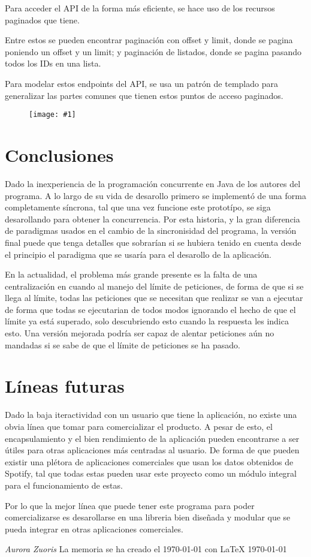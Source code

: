 \documentclass{article}
\newcommand{\cimg}[2]{
\begin{figure}[H]
	\center
		\texttt{[image: \#1]}
\end{figure}
}
\begin{document}
Para acceder el API de la forma más eficiente, se hace uso de los recursos paginados que tiene.

Entre estos se pueden encontrar paginación con offset y limit, donde se pagina poniendo un offset y un limit;
y paginación de listados, donde se pagina pasando todos los IDs en una lista.

Para modelar estos endpoints del API, se usa un patrón de templado para generalizar las partes comunes que tienen
estos puntos de acceso paginados.

\cimg{template.png}{0.9}

\newpage

\section{Conclusiones}

Dado la inexperiencia de la programación concurrente en Java de los autores del programa.
A lo largo de su vida de desarollo primero se implementó de una forma completamente síncrona,
tal que una vez funcione este prototípo, se siga desarollando para obtener la concurrencia.
Por esta historia, y la gran diferencia de paradigmas usados en el cambio de la sincronisidad
del programa, la versión final puede que tenga detalles que sobrarían si
se hubiera tenido en cuenta desde el principio el paradigma que se usaría para el desarollo de la aplicación.

En la actualidad, el problema más grande presente es la falta de una centralización en cuando al
manejo del límite de peticiones, de forma de que si se llega al límite, todas las peticiones
que se necesitan que realizar se van a ejecutar de forma que todas se ejecutarian de todos modos
ignorando el hecho de que el límite ya está superado, solo descubriendo esto cuando la respuesta les indica
esto. Una versión mejorada podría ser capaz de alentar peticiones aún no mandadas si se sabe de que el límite de
peticiones se ha pasado.

\section{Líneas futuras}

Dado la baja iteractividad con un usuario que tiene la aplicación, no existe
una obvia línea que tomar para comercializar el producto.
A pesar de esto, el encapsulamiento y el bien rendimiento de la aplicación 
pueden encontrarse a ser útiles para otras aplicaciones más centradas al usuario.
De forma de que pueden existir una plétora de aplicaciones comerciales que usan los datos
obtenidos de Spotify, tal que todas estas pueden usar este proyecto como un módulo integral
para el funcionamiento de estas.

Por lo que la mejor línea que puede tener este programa para poder comercializarse es
desarollarse en una libreria bien diseñada y modular que se pueda integrar en otras aplicaciones comerciales.


\printbibliography

\begin{titlepage}
	\centering
	{\large\itshape Aurora Zuoris}
	\vfill
	La memoria se ha creado el \today{} con \LaTeX{}
	\vfill
	\today
\end{titlepage}
\end{document}
